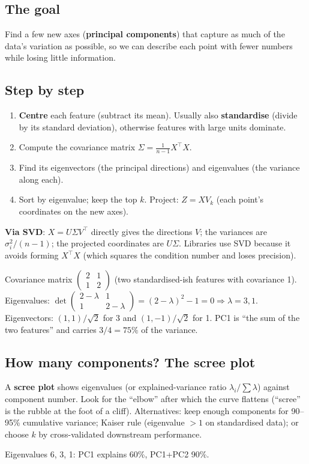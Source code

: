 \subsection{The goal}
Find a few new axes (\textbf{principal components}) that capture as much of the data's variation as possible, so we can describe each
point with fewer numbers while losing little information.

\subsection{Step by step}
\begin{enumerate}
\item \textbf{Centre} each feature (subtract its mean). Usually also \textbf{standardise} (divide by its standard deviation), otherwise
  features with large units dominate.
\item Compute the covariance matrix $\Sigma = \frac{1}{n-1}X^\top X$.
\item Find its eigenvectors (the principal directions) and eigenvalues (the variance along each).
\item Sort by eigenvalue; keep the top $k$. Project: $Z = XV_k$ (each point's coordinates on the new axes).
\end{enumerate}
\textbf{Via SVD}: $X = U\Sigma V^\top$ directly gives the directions $V$; the variances are $\sigma_i^2/(n-1)$; the projected coordinates
are $U\Sigma$. Libraries use SVD because it avoids forming $X^\top X$ (which squares the condition number and loses precision).

\begin{example}
Covariance matrix $\begin{pmatrix}2 & 1\\1 & 2\end{pmatrix}$ (two standardised-ish features with covariance 1).
Eigenvalues: $\det\begin{pmatrix}2-\lambda & 1\\1 & 2-\lambda\end{pmatrix} = (2-\lambda)^2 - 1 = 0\Rightarrow\lambda = 3, 1$.
Eigenvectors: $(1,1)/\sqrt2$ for 3 and $(1,-1)/\sqrt2$ for 1. PC1 is ``the sum of the two features'' and carries $3/4 = 75\%$ of the variance.
\end{example}

\subsection{How many components? The scree plot}
A \textbf{scree plot} shows eigenvalues (or explained-variance ratio $\lambda_i/\sum\lambda$) against component number. Look for the
``elbow'' after which the curve flattens (``scree'' is the rubble at the foot of a cliff). Alternatives: keep enough components for
90--95\% cumulative variance; Kaiser rule (eigenvalue $>1$ on standardised data); or choose $k$ by cross-validated downstream performance.
\begin{example}
Eigenvalues 6, 3, 1: PC1 explains 60\%, PC1+PC2 90\%.
\end{example}


